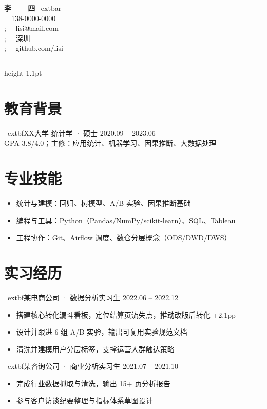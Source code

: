 \documentclass[UTF8,a4paper,10pt]{ctexart}
\begin{document}
\color{ink}

\begin{center}
  {\LARGE\bfseries\sffamily 李~~~~四} 
  \quad\	extbar
  \\[0.28em]
  {\small
    \faPhone~~138-0000-0000 \\;
    \faEnvelope~~lisi@mail.com \\;
    \faMapMarker~~深圳 \\;
    \faGithub~~github.com/lisi}
\end{center}

\vspace{0.35em}
{\color{accent}\hrule height 1.1pt}
\vspace{0.15em}

\section{教育背景}
\	extbf{XX大学} \hfill 统计学 · 硕士 \hfill 2020.09 -- 2023.06 \\
GPA 3.8/4.0；主修：应用统计、机器学习、因果推断、大数据处理

\section{专业技能}
\begin{itemize}
  \item 统计与建模：回归、树模型、A/B 实验、因果推断基础
  \item 编程与工具：Python（Pandas/NumPy/scikit-learn）、SQL、Tableau
  \item 工程协作：Git、Airflow 调度、数仓分层概念（ODS/DWD/DWS）
\end{itemize}

\section{实习经历}
\	extbf{某电商公司 · 数据分析实习生} \hfill 2022.06 -- 2022.12 \\
\begin{itemize}
  \item 搭建核心转化漏斗看板，定位结算页流失点，推动改版后转化 +2.1pp
  \item 设计并跟进 6 组 A/B 实验，输出可复用实验规范文档
  \item 清洗并建模用户分层标签，支撑运营人群触达策略
\end{itemize}

\	extbf{某咨询公司 · 商业分析实习生} \hfill 2021.07 -- 2021.10 \\
\begin{itemize}
  \item 完成行业数据抓取与清洗，输出 15+ 页分析报告
  \item 参与客户访谈纪要整理与指标体系草图设计
\end{itemize}
\end{document}
